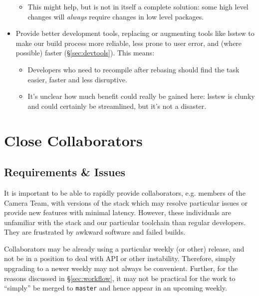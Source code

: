 \documentclass[DM,toc]{lsstdoc}
\begin{document}
\begin{itemize}
{\begin{itemize}
      \item{This might help, but is not in itself a complete solution: some
      high level changes will \textit{always} require changes in low level
      packages.}

    \end{itemize}

  }

  \item{Provide better development tools, replacing or augmenting tools like
  lsstsw to make our build process more reliable, less prone to user error,
  and (where possible) faster (\S\ref{sec:devtools}). This means:

    \begin{itemize}

      \item{Developers who need to recompile after rebasing should find the
      task easier, faster and less disruptive.}

      \item{It's unclear how much benefit could really be gained here: lsstsw
      is clunky and could certainly be streamlined, but it's not a disaster.}

    \end{itemize}

  }

\end{itemize}

\section{Close Collaborators}
\label{sec:collaborators}

\subsection{Requirements \& Issues}

It is important to be able to rapidly provide collaborators, e.g. members of
the Camera Team, with versions of the stack which may resolve particular
issues or provide new features with minimal latency. However, these
individuals are unfamiliar with the stack and our particular toolchain than
regular developers. They are frustrated by awkward software and failed builds.

Collaborators may be already using a particular weekly (or other) release, and
not be in a position to deal with API or other instability. Therefore, simply
upgrading to a newer weekly may not always be convenient. Further, for the
reasons discussed in \S\ref{sec:workflow}, it may not be practical for the
work to ``simply'' be merged to \texttt{master} and hence appear in an
upcoming weekly.
\end{document}
